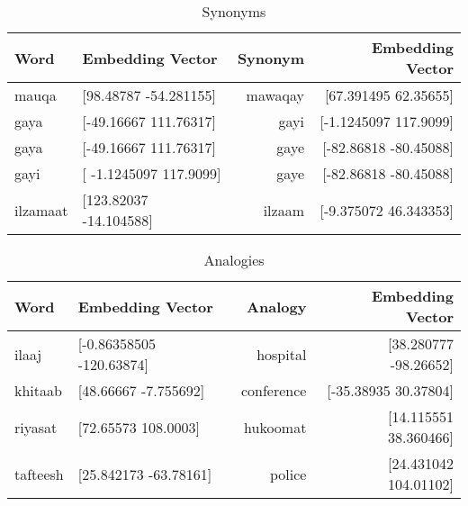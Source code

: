 \documentclass{exam}
\begin{document}
\begin{table}[h!]
  			\begin{center}
    			\caption{Synonyms}
    			\begin{tabular}{l|l|r|r}
      				\textbf{Word} & \textbf{Embedding Vector} & \textbf{Synonym} & \textbf{Embedding Vector}\\
      				\hline
      				mauqa & [98.48787  -54.281155] & mawaqay & [67.391495 62.35655]\\
      				gaya & [-49.16667 111.76317] & gayi & [-1.1245097 117.9099]\\
      				gaya & [-49.16667 111.76317] & gaye & [-82.86818 -80.45088]\\
      				gayi & [ -1.1245097 117.9099] & gaye & [-82.86818 -80.45088]\\
      				ilzamaat & [123.82037  -14.104588] & ilzaam & [-9.375072 46.343353]\\
    			\end{tabular}
  			\end{center}
\end{table}


\begin{table}[h!]
  			\begin{center}
    			\caption{Analogies}
    			\begin{tabular}{l|l|r|r}
      				\textbf{Word} & \textbf{Embedding Vector} & \textbf{Analogy} & \textbf{Embedding Vector}\\
      				\hline
      				ilaaj & [-0.86358505 -120.63874] & hospital & [38.280777 -98.26652]\\
      				khitaab & [48.66667  -7.755692] & conference & [-35.38935  30.37804]\\
      				riyasat & [72.65573 108.0003] & hukoomat & [14.115551 38.360466]\\
      				tafteesh & [25.842173 -63.78161] & police & [24.431042 104.01102]\\
    			\end{tabular}
  			\end{center}
\end{table}
\end{document}
